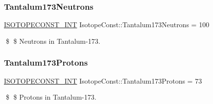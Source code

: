 \subsubsection{\texorpdfstring{Tantalum173\+Neutrons}{Tantalum173Neutrons}}
{\footnotesize\ttfamily \mbox{\hyperlink{group___isotope_const-_macros_ga5f18360b3e99483a35c32d789e62621c}{I\+S\+O\+T\+O\+P\+E\+C\+O\+N\+S\+T\+\_\+\+I\+NT}} Isotope\+Const\+::\+Tantalum173\+Neutrons = 100}

\$ \$ Neutrons in Tantalum-\/173. \mbox{\label{group___isotope_const-_tantalum-_ta173_ga32ddfb654c5c4015b75a524f097d8ec4}} 
\subsubsection{\texorpdfstring{Tantalum173\+Protons}{Tantalum173Protons}}
{\footnotesize\ttfamily \mbox{\hyperlink{group___isotope_const-_macros_ga5f18360b3e99483a35c32d789e62621c}{I\+S\+O\+T\+O\+P\+E\+C\+O\+N\+S\+T\+\_\+\+I\+NT}} Isotope\+Const\+::\+Tantalum173\+Protons = 73}

\$ \$ Protons in Tantalum-\/173. 